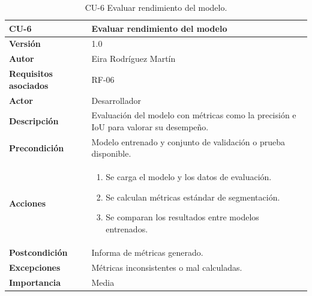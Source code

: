 \begin{table}[!h]
	\centering
	\begin{tabularx}{\linewidth}{ p{} p{} }
		\toprule
		\textbf{CU-6}    & \textbf{Evaluar rendimiento del modelo}\\
		\toprule
		\textbf{Versión}              & 1.0    \\
		\textbf{Autor}                & Eira Rodríguez Martín \\
		\textbf{Requisitos asociados} & RF-06 \\
        \textbf{Actor}                & Desarrollador \\
		\textbf{Descripción}          & Evaluación del modelo con métricas como la precisión e IoU para valorar su desempeño.\\
		\textbf{Precondición}         & Modelo entrenado y conjunto de validación o prueba disponible. \\
		\textbf{Acciones}             &
		\begin{enumerate}
			\def\labelenumi{\arabic{enumi}.}
			\tightlist
			\item Se carga el modelo y los datos de evaluación.
			\item Se calculan métricas estándar de segmentación.
            \item Se comparan los resultados entre modelos entrenados.
		\end{enumerate}\\
		\textbf{Postcondición}        & Informa de métricas generado. \\
		\textbf{Excepciones}          & Métricas inconsistentes o mal calculadas. \\
		\textbf{Importancia}          & Media \\
		\bottomrule
	\end{tabularx}
	\caption{CU-6 Evaluar rendimiento del modelo.}
\end{table}



